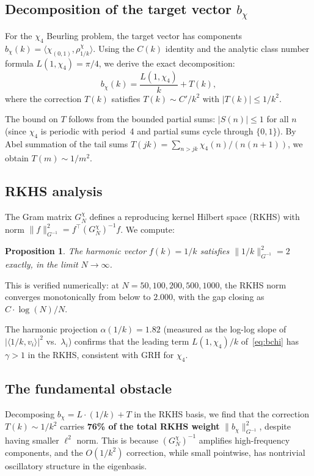 \documentclass[11pt,a4paper]{article}
\newtheorem{proposition}{Proposition}
\begin{document}
\subsection{Decomposition of the target vector $b_\chi$}

For the $\chi_4$ Beurling problem, the target vector has components $b_\chi(k) = \langle \chi_{(0,1)}, \rho_{1/k}^\chi \rangle$. Using the $C(k)$ identity and the analytic class number formula $L(1,\chi_4) = \pi/4$, we derive the exact decomposition:
\begin{equation}\label{eq:bchi}
b_\chi(k) = \frac{L(1,\chi_4)}{k} + T(k),
\end{equation}
where the correction $T(k)$ satisfies $T(k) \sim C'/k^2$ with $|T(k)| \leq 1/k^2$.

The bound on $T$ follows from the bounded partial sums: $|S(n)| \leq 1$ for all $n$ (since $\chi_4$ is periodic with period~4 and partial sums cycle through $\{0, 1\}$). By Abel summation of the tail sums $T(jk) = \sum_{n>jk} \chi_4(n)/(n(n+1))$, we obtain $T(m) \sim 1/m^2$.

\subsection{RKHS analysis}

The Gram matrix $G_N^\chi$ defines a reproducing kernel Hilbert space (RKHS) with norm $\|f\|_{G^{-1}}^2 = f^\top (G_N^\chi)^{-1} f$. We compute:

\begin{proposition}\label{prop:rkhs}
The harmonic vector $f(k) = 1/k$ satisfies $\|1/k\|_{G^{-1}}^2 = 2$ exactly, in the limit $N \to \infty$.
\end{proposition}

This is verified numerically: at $N = 50, 100, 200, 500, 1000$, the RKHS norm converges monotonically from below to $2.000$, with the gap closing as $C \cdot \log(N)/N$.

The harmonic projection $\alpha(1/k) = 1.82$ (measured as the log-log slope of $|\langle 1/k, v_i \rangle|^2$ vs.\ $\lambda_i$) confirms that the leading term $L(1,\chi_4)/k$ of~\eqref{eq:bchi} has $\gamma > 1$ in the RKHS, consistent with GRH for $\chi_4$.

\subsection{The fundamental obstacle}

Decomposing $b_\chi = L \cdot (1/k) + T$ in the RKHS basis, we find that the correction $T(k) \sim 1/k^2$ carries \textbf{76\% of the total RKHS weight} $\|b_\chi\|_{G^{-1}}^2$, despite having smaller $\ell^2$ norm. This is because $(G_N^\chi)^{-1}$ amplifies high-frequency components, and the $O(1/k^2)$ correction, while small pointwise, has nontrivial oscillatory structure in the eigenbasis.
\end{document}
